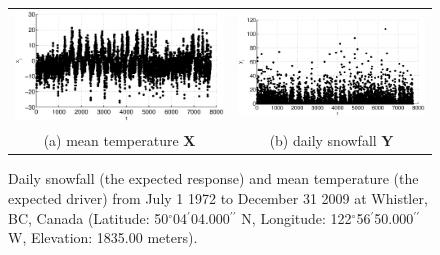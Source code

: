 \documentclass{article}[10pt]
\begin{document}
\begin{figure}[ht]
\begin{tabular}{cc}
\includegraphics[scale=0.48]{WhistlerDailyExample_X.eps} & \includegraphics[scale=0.48]{WhistlerDailyExample_Y.eps} \\
(a) mean temperature $\mathbf{X}$ & (b) daily snowfall $\mathbf{Y}$
\end{tabular}
\caption{Daily snowfall (the expected response) and mean temperature (the expected driver) from July 1 1972 to December 31 2009 at Whistler, BC, Canada (Latitude: 50$^\circ$04$^\prime$04.000$^{\prime\prime}$ N, Longitude: 122$^\circ$56$^\prime$50.000$^{\prime\prime}$ W, Elevation: 1835.00 meters).}
\label{fig:WhistSnowxyplot}
\end{figure}
\end{document}
